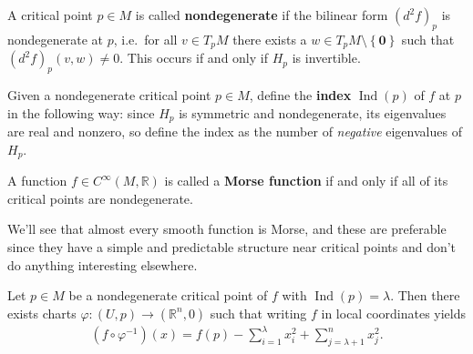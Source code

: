 \begin{definition}

A critical point \(p\in M\) is called \textbf{nondegenerate} if the
bilinear form \((d^2 f)_p\) is nondegenerate at \(p\), i.e.~for all
\(v\in T_p M\) there exists a
\(w\in T_pM\setminus\left\{{\mathbf{0}}\right\}\) such that
\((d^2 f)_p(v, w) \neq 0\). This occurs if and only if \(H_p\) is
invertible.

\end{definition}

\begin{definition}

Given a nondegenerate critical point \(p\in M\), define the
\textbf{index} \(\mathop{\mathrm{Ind}}(p)\) of \(f\) at \(p\) in the
following way: since \(H_p\) is symmetric and nondegenerate, its
eigenvalues are real and nonzero, so define the index as the number of
\emph{negative} eigenvalues of \(H_p\).

\end{definition}

\begin{definition}

A function \(f\in C^ \infty (M, {\mathbb{R}})\) is called a
\textbf{Morse function} if and only if all of its critical points are
nondegenerate.

\end{definition}

\begin{remark}

We'll see that almost every smooth function is Morse, and these are
preferable since they have a simple and predictable structure near
critical points and don't do anything interesting elsewhere.

\end{remark}

\begin{theorem}

Let \(p\in M\) be a nondegenerate critical point of \(f\) with
\(\mathop{\mathrm{Ind}}(p) = \lambda\). Then there exists charts
\(\varphi:(U, p) \to ({\mathbb{R}}^n, 0)\) such that writing \(f\) in
local coordinates yields
\begin{align*}
(f \circ \varphi ^{-1} )(x) = f(p) - \sum_{i=1}^{\lambda} x_i^2 + \sum_{j= \lambda + 1}^n x_j^2
.\end{align*}

\end{theorem}


